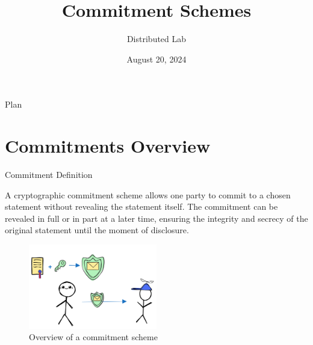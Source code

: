 \documentclass{zkdl-presentation-template}
\title[Commitment Schemes]{\textbf{Commitment Schemes}}
\author{Distributed Lab}
\date{August 20, 2024}
\begin{document}
 
	\begin{frame}{Plan}
        \tableofcontents
    \end{frame}

	\section{Commitments Overview}

    \begin{frame}{Commitment Definition}
        \begin{definition}
            A cryptographic commitment scheme allows one party to commit to a chosen statement without revealing the statement itself. 
            The commitment can be revealed in full or in part at a later time, ensuring the integrity and secrecy of the original statement until 
            the moment of disclosure.
        \end{definition}

        \begin{figure}
            \centering
            \includegraphics[width=0.5\textwidth]{images/lecture_5/CommitmentExample.png}
            \caption{Overview of a commitment scheme}
        \end{figure}
    \end{frame}
\end{document}
